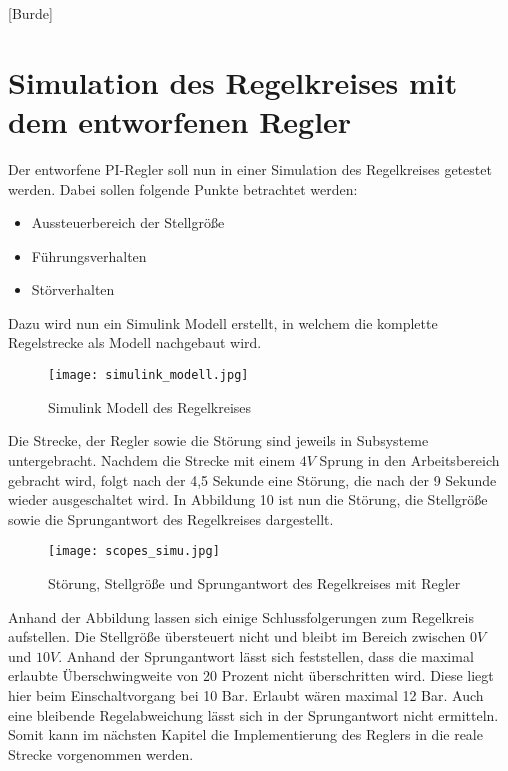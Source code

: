 
\newpage

[Burde]
\section{Simulation des Regelkreises mit dem entworfenen Regler} \label{Kapitel7}

Der entworfene PI-Regler soll nun in einer Simulation des Regelkreises getestet werden. Dabei sollen folgende Punkte betrachtet werden:

\begin{itemize}
\item Aussteuerbereich der Stellgröße

\item Führungsverhalten

\item Störverhalten
\end{itemize}

Dazu wird nun ein Simulink Modell erstellt, in welchem die komplette Regelstrecke als Modell nachgebaut wird. 

\begin{figure}[h]
	\begin{center}
		\texttt{[image: simulink\_modell.jpg]}
		\caption{Simulink Modell des Regelkreises}
       \label{simulink}
	\end{center} 
\end{figure}

Die Strecke, der Regler sowie die Störung sind jeweils in Subsysteme untergebracht. Nachdem die Strecke mit einem $4V$ Sprung in den Arbeitsbereich gebracht wird, folgt nach der 4,5 Sekunde eine Störung, die nach der 9 Sekunde wieder ausgeschaltet wird. In Abbildung 10 ist nun die Störung, die Stellgröße sowie die Sprungantwort des Regelkreises dargestellt.

\newpage

\begin{figure}[h]
	\begin{center}
		\texttt{[image: scopes\_simu.jpg]}
		\caption{Störung, Stellgröße und Sprungantwort des Regelkreises mit Regler}
       \label{scope_simu}
	\end{center} 
\end{figure}

Anhand der Abbildung lassen sich einige Schlussfolgerungen zum Regelkreis aufstellen. Die Stellgröße übersteuert nicht und bleibt im Bereich zwischen $0V$ und $10V$. Anhand der Sprungantwort lässt sich feststellen, dass die maximal erlaubte Überschwingweite von 20 Prozent nicht überschritten wird. Diese liegt hier beim Einschaltvorgang bei 10 Bar. Erlaubt wären maximal 12 Bar. Auch eine bleibende Regelabweichung lässt sich in der Sprungantwort nicht ermitteln. Somit kann im nächsten Kapitel die Implementierung des Reglers in die reale Strecke vorgenommen werden.

